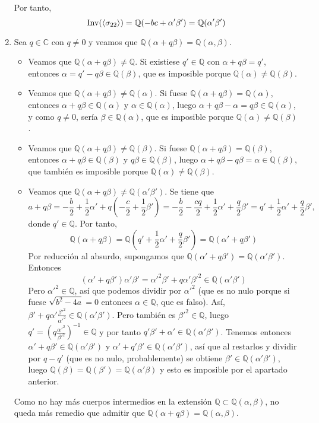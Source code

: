 \documentclass[11pt]{report}
\makeatletter
\renewenvironment{proof}[1][\proofname]{\par
  \pushQED{\qed}%
  \normalfont \topsep\z@skip %
  \trivlist
  \item[\hskip\labelsep
        \itshape
    #1\@addpunct{.}]\ignorespaces
}{%
  \popQED\endtrivlist\@endpefalse
}
\newcommand{\Q}{\mathbb Q}
\newcommand{\C}{\mathbb C}
\makeatother
\begin{document}
\begin{proof}
\begin{enumerate}
    Por tanto,
    \[\textup{Inv}(\langle\sigma_{22} \rangle) = \Q(-bc+\alpha'\beta') = \Q(\alpha'\beta')\]
    \item Sea $q \in \C$ con $q \neq 0$ y veamos que $\Q(\alpha+q\beta) = \Q(\alpha,\beta)$.
    \begin{itemize}
        \item Veamos que $\Q(\alpha+q\beta) \neq \Q$. Si existiese $q' \in \Q$ con $\alpha+q\beta = q'$, entonces $\alpha = q'-q\beta \in \Q(\beta)$, que es imposible porque $\Q(\alpha) \neq \Q(\beta)$.
        \item Veamos que $\Q(\alpha+q\beta) \neq \Q(\alpha)$. Si fuese $\Q(\alpha+q\beta) = \Q(\alpha)$, entonces $\alpha+q\beta \in \Q(\alpha)$ y $\alpha \in \Q(\alpha)$, luego $\alpha+q\beta-\alpha = q\beta \in \Q(\alpha)$, y como $q \neq 0$, sería $\beta \in \Q(\alpha)$, que es imposible porque $\Q(\alpha) \neq \Q(\beta)$.
        \item Veamos que $\Q(\alpha+q\beta) \neq \Q(\beta)$. Si fuese $\Q(\alpha+q\beta) = \Q(\beta)$, entonces $\alpha+q\beta \in \Q(\beta)$ y $q\beta \in \Q(\beta)$, luego $\alpha+q\beta-q\beta =\alpha \in \Q(\beta)$, que también es imposible porque $\Q(\alpha) \neq \Q(\beta)$.
        \item Veamos que $\Q(\alpha+q\beta) \neq \Q(\alpha'\beta')$. Se tiene que
        \[a+q\beta = -\frac{b}{2}+\frac{1}{2}\alpha'+q\left(-\frac{c}{2}+\frac{1}{2}\beta'\right) = -\frac{b}{2}-\frac{cq}{2}+\frac{1}{2}\alpha'+\frac{q}{2}\beta' = q'+\frac{1}{2}\alpha'+\frac{q}{2}\beta',\]
        donde $q' \in \Q$. Por tanto, \[\Q(\alpha+q\beta) = \Q(q'+\frac{1}{2}\alpha'+\frac{q}{2}\beta') = \Q(\alpha'+q\beta')\] Por reducción al absurdo, supongamos que $\Q(\alpha'+q\beta') = \Q(\alpha'\beta')$. Entonces \[(\alpha'+q\beta')\alpha'\beta' = \alpha'^2\beta'+q\alpha'\beta'^2 \in \Q(\alpha'\beta')\] Pero $\alpha'^2 \in \Q$, así que podemos dividir por $\alpha'^2$ (que es no nulo porque si fuese $\sqrt{b^2-4a} = 0$ entonces $\alpha \in \Q$, que es falso). Así, $\beta'+q\alpha'\frac{\beta'^2}{\alpha'^2} \in \Q(\alpha'\beta')$. Pero también es $\beta'^2 \in \Q$, luego $q'=(q\frac{\alpha'^2}{\beta'^2})^{-1} \in \Q$ y por tanto $q'\beta'+\alpha' \in \Q(\alpha'\beta')$. Tenemos entonces $\alpha'+q\beta' \in \Q(\alpha'\beta')$ y $\alpha'+q'\beta' \in \Q(\alpha'\beta')$, así que al restarlos y dividir por $q-q'$ (que es no nulo, probablemente) se obtiene $\beta' \in \Q(\alpha'\beta')$, luego $\Q(\beta) = \Q(\beta') = \Q(\alpha'\beta)$ y esto es imposible por el apartado anterior.
    \end{itemize}
    Como no hay más cuerpos intermedios en la extensión $\Q \subset \Q(\alpha,\beta)$, no queda más remedio que admitir que $\Q(\alpha+q\beta) = \Q(\alpha,\beta)$. \qedhere
    \end{enumerate}
\end{proof}
\end{document}
